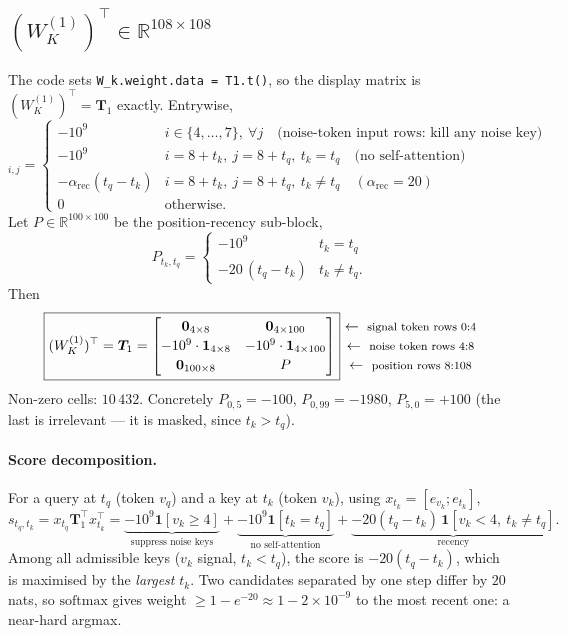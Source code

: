 \documentclass[11pt]{article}
\newcommand{\R}{\mathbb{R}}
\newcommand{\Wk}{W_K}
\newcommand{\rowlab}[1]{\ \leftarrow\ \text{\footnotesize #1}}
\begin{document}
\subsection{$(\Wk^{(1)})^\top\in\R^{108\times108}$}
The code sets \texttt{W\_k.weight.data = T1.t()}, so the display matrix is
$(\Wk^{(1)})^\top=\bm{T}_1$ exactly. Entrywise,
\begin{equation}
[\bm{T}_1]_{i,j}=
\begin{cases}
-10^{9} & i\in\{4,\dots,7\},\ \forall j \quad\text{(noise-token input rows: kill any noise key)}\\
-10^{9} & i=8{+}t_k,\ j=8{+}t_q,\ t_k=t_q \quad\text{(no self-attention)}\\
-\alpha_{\mathrm{rec}}(t_q-t_k) & i=8{+}t_k,\ j=8{+}t_q,\ t_k\neq t_q \quad(\alpha_{\mathrm{rec}}=20)\\
0 & \text{otherwise.}
\end{cases}
\end{equation}
Let $P\in\R^{100\times100}$ be the position-recency sub-block,
\begin{equation}
P_{t_k,t_q}=\begin{cases}-10^{9} & t_k=t_q\\ -20\,(t_q-t_k) & t_k\neq t_q.\end{cases}
\end{equation}
Then
\begin{equation}
\boxed{
(\Wk^{(1)})^\top=\bm{T}_1=
\begin{bmatrix}
\bm{0}_{4\times8} & \bm{0}_{4\times100}\\[2pt]
-10^{9}\cdot\bm{1}_{4\times8} & -10^{9}\cdot\bm{1}_{4\times100}\\[2pt]
\bm{0}_{100\times8} & P
\end{bmatrix}}
\begin{matrix}
\rowlab{signal token rows $0{:}4$}\\[2pt]
\rowlab{noise token rows $4{:}8$}\\[2pt]
\rowlab{position rows $8{:}108$}
\end{matrix}
\end{equation}
Non-zero cells: $10\,432$. Concretely $P_{0,5}=-100$, $P_{0,99}=-1980$, $P_{5,0}=+100$
(the last is irrelevant --- it is masked, since $t_k>t_q$).

\paragraph{Score decomposition.} For a query at $t_q$ (token $v_q$) and a key at $t_k$ (token
$v_k$), using $x_{t_k}=[e_{v_k};e_{t_k}]$,
\begin{equation}
s_{t_q,t_k}=x_{t_q}\bm{T}_1^\top x_{t_k}^\top
=\underbrace{-10^{9}\bm{1}[v_k\ge4]}_{\text{suppress noise keys}}
+\underbrace{-10^{9}\bm{1}[t_k=t_q]}_{\text{no self-attention}}
+\underbrace{-20(t_q-t_k)\,\bm{1}[v_k<4,\ t_k\neq t_q]}_{\text{recency}} .
\end{equation}
Among all admissible keys ($v_k$ signal, $t_k<t_q$), the score is $-20(t_q-t_k)$, which is
maximised by the \emph{largest} $t_k$. Two candidates separated by one step differ by $20$ nats,
so $\mathrm{softmax}$ gives weight $\ge 1-e^{-20}\approx1-2\times10^{-9}$ to the most recent one:
a near-hard argmax.
\end{document}

